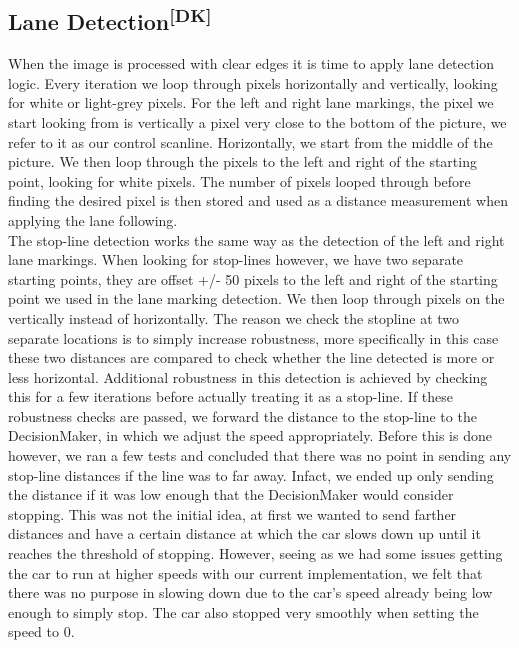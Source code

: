 \subsection[Lane Detection]{Lane Detection\textsuperscript{[DK]}}
When the image is processed with clear edges it is time to apply lane detection
logic. Every iteration we loop through pixels horizontally and vertically,
looking for white or light-grey pixels. For the left and right lane markings,
the pixel we start looking from is vertically a pixel very close to the bottom
of the picture, we refer to it as our control scanline. Horizontally, we start
from the middle of the picture. We then loop through the pixels to the left and
right of the starting point, looking for white pixels. The number of pixels
looped through before finding the desired pixel is then stored and used as a
distance measurement when applying the lane following.\\

\noindent
The stop-line detection works the same way as the detection of the left and
right lane markings. When looking for stop-lines however, we have two separate
starting points, they are offset +/- 50 pixels to the left and right of the
starting point we used in the lane marking detection. We then loop through
pixels on the vertically instead of horizontally. The reason we check the
stopline at two separate locations is to simply increase robustness, more
specifically in this case these two distances are compared to check whether the
line detected is more or less horizontal. Additional robustness in this
detection is achieved by checking this for a few iterations before actually
treating it as a stop-line. If these robustness checks are passed, we forward
the distance to the stop-line to the DecisionMaker, in which we adjust the speed
appropriately. Before this is done however, we ran a few tests and concluded
that there was no point in sending any stop-line distances if the line was to
far away. Infact, we ended up only sending the distance if it was low enough
that the DecisionMaker would consider stopping. This was not the initial idea,
at first we wanted to send farther distances and have a certain distance at
which the car slows down up until it reaches the threshold of stopping. However,
seeing as we had some issues getting the car to run at higher speeds with our
current implementation, we felt that there was no purpose in slowing down due to
the car's speed already being low enough to simply stop. The car also stopped
very smoothly when setting the speed to 0.\\

